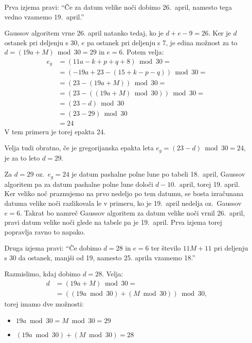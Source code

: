 \documentclass[a4paper,12pt]{article}
\begin{document}
Prva izjema pravi: ``Če za datum velike noči dobimo 26.\ april, namesto tega vedno 
vzamemo 19.\ april.''

Gaussov algoritem vrne 26. april natanko tedaj, ko je $d + e - 9 = 26$. Ker je 
$d$ ostanek pri deljenju s 30, $e$ pa ostanek pri deljenju s 7, je edina možnost 
za to $d = (19 a + M) \bmod 30 = 29$ in $e = 6$. 
Potem velja:
\begin{align*}
    e_g &= (11a - k + p + q + 8) \bmod 30 = \\
        &= (-19 a + 23 - (15 + k - p - q)) \bmod 30 = \\
        &= (23 - (19 a + M)) \bmod 30 = \\
        &= (23 - ((19 a + M) \bmod 30)) \bmod 30 = \\
        &= (23 - d) \bmod 30 \\
        &= (23 - 29) \bmod 30 \\
        &= 24 %
\end{align*}
V tem primeru je torej epakta 24.

Velja tudi obratno, če je gregorijanska epakta leta $e_g = (23 - d) \bmod 30 = 24$, 
je za to leto $d = 29$.

Za $d = 29$ oz.\ $e_g = 24$ je datum pashalne polne lune po tabeli 18.\ april, 
Gaussov algoritem pa za datum pashalne polne lune določi $d - 10$.\ april, torej 
19. april. Ker veliko noč praznujemo na prvo nedeljo po tem datumu, se bosta 
izračunana datuma velike noči razlikovala le v primeru, ko je 19.\ april nedelja 
oz.\ Gaussov $e = 6$.
Takrat bo namreč Gaussov algoritem za datum velike noči vrnil 26.\ april, pravi 
datum velike noči glede na tabele pa je 19.\ april. Prva izjema torej popravlja 
ravno to napako.

Druga izjema pravi: ``Če dobimo $d = 28$ in $e = 6$ ter število $11M + 11$ pri deljenju
s 30 da ostanek, manjši od 19, namesto 25. aprila vzamemo 18.''

Razmislimo, kdaj dobimo $d=28$. Velja:
\begin{align*}
    d &= (19 a + M) \bmod 30 = \\
    &= ((19 a \bmod 30) + (M \bmod 30)) \bmod 30, 
\end{align*}
torej imamo dve možnosti:
\begin{itemize} %
    \item $19 a \bmod 30 = M \bmod 30 = 29$
    \item $(19 a \bmod 30) + (M \bmod 30) = 28$
\end{itemize}
\end{document}
